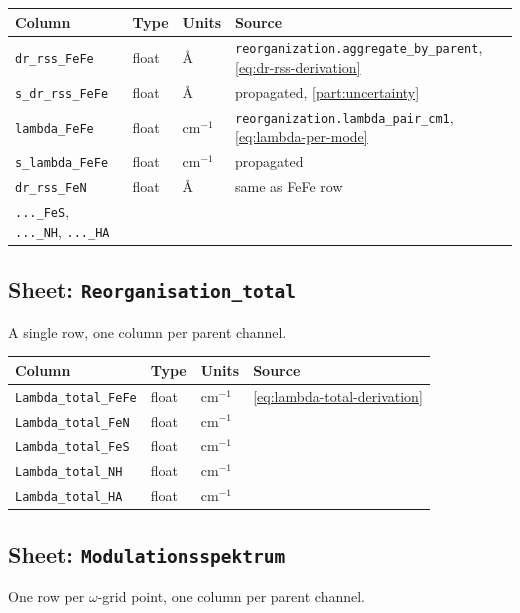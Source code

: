 \documentclass[10pt,a4paper,twoside]{article}
\newcommand{\fn}[1]{\texttt{#1}}
\begin{document}
\begin{longtable}{p{} p{} p{} p{}}
\toprule
\textbf{Column} & \textbf{Type} & \textbf{Units} & \textbf{Source} \\
\midrule
\texttt{dr\_rss\_FeFe}     & float  & \AA{}     & \fn{reorganization.aggregate\_by\_parent}, \cref{eq:dr-rss-derivation} \\
\texttt{s\_dr\_rss\_FeFe}  & float  & \AA{}     & propagated, \cref{part:uncertainty} \\
\texttt{lambda\_FeFe}      & float  & cm$^{-1}$ & \fn{reorganization.lambda\_pair\_cm1}, \cref{eq:lambda-per-mode} \\
\texttt{s\_lambda\_FeFe}   & float  & cm$^{-1}$ & propagated \\
\texttt{dr\_rss\_FeN}      & float  & \AA{}     & same as FeFe row \\
\texttt{...\_FeS}, \texttt{...\_NH}, \texttt{...\_HA} & & & \\
\bottomrule
\end{longtable}

\subsection{Sheet: \texttt{Reorganisation\_total}}

A single row, one column per parent channel.

\begin{longtable}{p{} p{} p{} p{}}
\toprule
\textbf{Column} & \textbf{Type} & \textbf{Units} & \textbf{Source} \\
\midrule
\texttt{Lambda\_total\_FeFe} & float & cm$^{-1}$ & \cref{eq:lambda-total-derivation} \\
\texttt{Lambda\_total\_FeN}  & float & cm$^{-1}$ & \\
\texttt{Lambda\_total\_FeS}  & float & cm$^{-1}$ & \\
\texttt{Lambda\_total\_NH}   & float & cm$^{-1}$ & \\
\texttt{Lambda\_total\_HA}   & float & cm$^{-1}$ & \\
\bottomrule
\end{longtable}

\subsection{Sheet: \texttt{Modulationsspektrum}}

One row per $\omega$-grid point, one column per parent channel.
\end{document}
